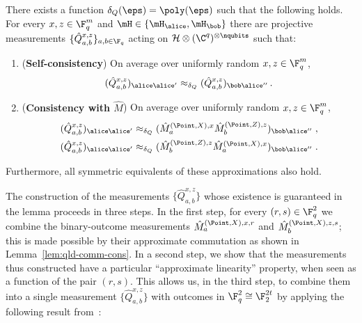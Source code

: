 \begin{lemma}\label{lem:qld-4-10}
There exists a function $\delta_Q(\eps) = \poly(\eps)$ such that the following holds. 
	For every $x,z \in \F_q^m$ and $\mH \in \{ \mH_\alice, \mH_\bob\}$ there are projective measurements $\{ \hat{Q}^{x,z}_{a,b} \}_{a,b \in \F_q}$ acting on $\mathcal{H} \otimes (\C^q)^{\otimes \nqubits}$ such that:
	\begin{enumerate}
		\item (\textbf{Self-consistency}) On average over uniformly random $x,z \in \F_q^m$,
		\begin{equation}
			\label{eq:qld-q-self-cons}
			(\hat{Q}^{x,z}_{a,b})_{\alice \alice'}  \approx_{\delta_Q} (\hat{Q}^{x,z}_{a,b})_{\bob \alice''}\,.
		\end{equation}
		
		\item (\textbf{Consistency with $\hat{M}$}) On average over uniformly random $x,z \in \F_q^m$,
		\begin{gather}
			\label{eq:qld-q-cons-m-hat-xz}
				(\hat{Q}^{x,z}_{a,b})_{\alice \alice'} \approx_{\delta_Q} (\hat{M}^{(\Point,X),x}_{a} \hat{M}^{(\Point,Z),z}_b)_{\bob \alice''}\;, \\
							\label{eq:qld-q-cons-m-hat-zx}
				(\hat{Q}^{x,z}_{a,b})_{\alice \alice'} \approx_{\delta_Q} (\hat{M}^{(\Point,Z),z}_b  \hat{M}^{(\Point,X),x}_{a} )_{\bob \alice''}\;.
		\end{gather}
              \end{enumerate}
                    Furthermore, all symmetric equivalents of these approximations
      also hold.
\end{lemma}

The construction of the measurements $\{ \hat{Q}^{x,z}_{a,b} \}$ whose existence is guaranteed in the lemma proceeds in three steps. In the first step, for every $(r,s)\in\F_q^2$ we combine the binary-outcome measurements $\hat{M}^{(\Point,X),x,r}_a$ and $\hat{M}^{(\Point,X),z,s}_b$; this is made possible by their approximate commutation as shown in Lemma~\ref{lem:qld-comm-cons}. In a second step, we show that the measurements thus constructed have a particular ``approximate linearity'' property, when seen as a function of the pair $(r,s)$. This allows us, in the third step, to combine them into a single measurement $\{ \hat{Q}^{x,z}_{a,b} \}$ with outcomes in $\F_q^2\cong \F_2^{2t}$ by applying the following  result from~\cite{NV17}:
	
